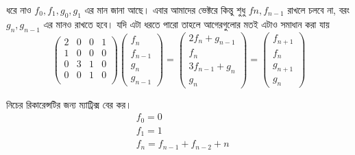 ধরে নাও $f_{0}, f_{1}, g_{0}, g_{1}$ এর মান জানা আছে। এবার আমাদের ভেক্টরে কিন্তু শুধু $f{n}, f_{n - 1}$ রাখলে চলবে না, বরং $g_{n}, g_{n - 1}$ এর মানও রাখতে হবে। যদি এটা ধরতে পারো তাহলে আগেরগুলোর মতই এটাও সমাধান করা যায় 
$$
\begin{pmatrix}
2 & 0 & 0 & 1 \\
1 & 0 & 0 & 0 \\
0 & 3 & 1 & 0 \\
0 & 0 & 1 & 0 \\
\end{pmatrix} 
\begin{pmatrix}
f_{n} \\
f_{n - 1} \\ 
g_{n} \\
g_{n - 1}
\end{pmatrix}
= 
\begin{pmatrix}
2f_{n} + g_{n - 1}\\
f_{n} \\
3f_{n - 1} + g_{n} \\
g_{n} 
\end{pmatrix}
=
\begin{pmatrix}
f_{n + 1} \\
f_{n} \\
g_{n + 1} \\
g_{n}
\end{pmatrix}
$$ 

\begin{problem}
নিচের রিকারেন্সটির জন্য ম্যাট্রিক্স বের কর। 
\begin{align*}
& f_{0} = 0 \\
& f_{1} = 1 \\
& f_{n} = f_{n - 1} + f_{n - 2} + n
\end{align*}

\end{problem}
